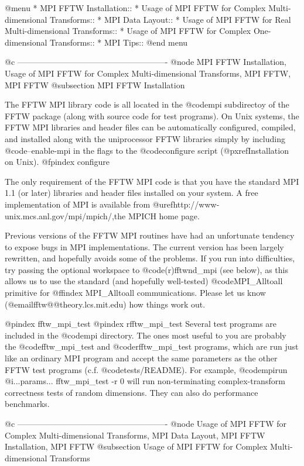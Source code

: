 @menu
* MPI FFTW Installation::       
* Usage of MPI FFTW for Complex Multi-dimensional Transforms::  
* MPI Data Layout::             
* Usage of MPI FFTW for Real Multi-dimensional Transforms::  
* Usage of MPI FFTW for Complex One-dimensional Transforms::  
* MPI Tips::                    
@end menu

@c -------------------------------------------------------
@node MPI FFTW Installation, Usage of MPI FFTW for Complex Multi-dimensional Transforms, MPI FFTW, MPI FFTW
@subsection MPI FFTW Installation

The FFTW MPI library code is all located in the @code{mpi} subdirectoy
of the FFTW package (along with source code for test programs).  On Unix
systems, the FFTW MPI libraries and header files can be automatically
configured, compiled, and installed along with the uniprocessor FFTW
libraries simply by including @code{--enable-mpi} in the flags to the
@code{configure} script (@pxref{Installation on Unix}).
@fpindex configure

The only requirement of the FFTW MPI code is that you have the standard
MPI 1.1 (or later) libraries and header files installed on your system.
A free implementation of MPI is available from
@uref{http://www-unix.mcs.anl.gov/mpi/mpich/,the MPICH home page}.

Previous versions of the FFTW MPI routines have had an unfortunate
tendency to expose bugs in MPI implementations.  The current version has
been largely rewritten, and hopefully avoids some of the problems.  If
you run into difficulties, try passing the optional workspace to
@code{(r)fftwnd_mpi} (see below), as this allows us to use the standard
(and hopefully well-tested) @code{MPI_Alltoall} primitive for
@ffindex MPI_Alltoall
communications.  Please let us know (@email{fftw@@theory.lcs.mit.edu})
how things work out.

@pindex fftw_mpi_test
@pindex rfftw_mpi_test
Several test programs are included in the @code{mpi} directory.  The
ones most useful to you are probably the @code{fftw_mpi_test} and
@code{rfftw_mpi_test} programs, which are run just like an ordinary MPI
program and accept the same parameters as the other FFTW test programs
(c.f. @code{tests/README}).  For example, @code{mpirun @i{...params...}
fftw_mpi_test -r 0} will run non-terminating complex-transform
correctness tests of random dimensions.  They can also do performance
benchmarks.

@c -------------------------------------------------------
@node Usage of MPI FFTW for Complex Multi-dimensional Transforms, MPI Data Layout, MPI FFTW Installation, MPI FFTW
@subsection Usage of MPI FFTW for Complex Multi-dimensional Transforms

